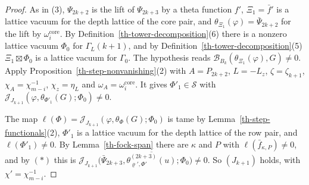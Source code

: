\begin{proof}
As in (3), $\Psi_{2k+2}$ is the lift of $\Psi_{2k+3}$ by a theta function $f'$,
$\Xi_1=\bar f'$ is a lattice vacuum for the depth lattice of the core pair, and
$\theta_{\Xi_1}(\varphi)=\bar\Psi_{2k+2}$ for the lift by
$\omega^{\mathrm{core}}_i$. By Definition~\ref{th-tower-decomposition}(6) there
is a nonzero lattice vacuum $\Phi_0$ for $\Gamma_L(k+1)$, and by
Definition~\ref{th-tower-decomposition}(5) $\Xi_1\boxtimes\Phi_0$ is a lattice
vacuum for $\Gamma_0$. The hypothesis reads
$\mathcal B_{B_k}(\theta_{\Xi_1}(\varphi),G)\neq0$. Apply
Proposition~\ref{th-step-nonvanishing}(2) with $A=P_{2k+2}$, $L=-L_z$,
$\zeta=\zeta_{k+1}$, $\chi_A=\chi_{m-i}^{-1}$, $\chi_z=\eta_L$ and
$\omega_A=\omega^{\mathrm{core}}_i$. It gives $\Phi'_1\in\mathcal S$ with
$\mathcal J_{J_{k+1}}(\varphi,\theta_{\Phi'_1}(G);\Phi_0)\neq0$.

The map $\ell(\Phi)=\mathcal J_{J_{k+1}}(\varphi,\theta_\Phi(G);\Phi_0)$ is tame
by Lemma~\ref{th-step-functionals}(2), $\Phi'_1$ is a lattice vacuum for the
depth lattice of the row pair, and $\ell(\Phi'_1)\neq0$. By
Lemma~\ref{th-fock-span} there are $\kappa$ and $P$ with
$\ell(\bar f_{\kappa,P})\neq0$, and by $(*)$ this is
$\mathcal J_{J_{k+1}}\bigl(\bar\Psi_{2k+3},\overline{\theta^{(2k+3)}_{\varrho',\Phi'}(u)};\Phi_0\bigr)\neq0$.
So $(J_{k+1})$ holds, with $\chi'=\chi_{m-i}^{-1}$.


\end{proof}
